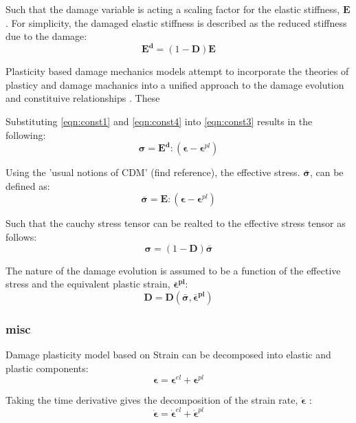 Such that the damage variable is acting a scaling factor for the elastic stiffness, $\mathbf{E}$. For simplicity, the damaged elastic stiffness is described as the
reduced stiffness due to the damage: 
\begin{equation}
\mathbf{E^{d}}=(1-\mathbf{D})\mathbf{E}\label{eqn:const4}
\end{equation}

Plasticity based damage mechanics models attempt to incorporate the
theories of plasticy and damage machanics into a unified approach
to the damage evolution and constituive relationships \cite{zhang_continuum_2010}. These 





Substituting \ref{eqn:const1} and \ref{eqn:const4} into \ref{eqn:const3}
results in the following: 
\begin{equation}
\boldsymbol{\sigma}=\mathbf{E^{d}}:(\boldsymbol{\epsilon}-\boldsymbol{\epsilon}^{pl})\label{eqn:const5}
\end{equation}


Using the 'usual notions of CDM' (find
reference), the effective stress. $\boldsymbol{\bar{\sigma}}$, can
be defined as: 
\begin{equation}
\boldsymbol{\bar{\sigma}}=\mathbf{E}:(\boldsymbol{\epsilon}-\boldsymbol{\epsilon}^{pl})\label{eqn:const6}
\end{equation}


Such that the cauchy stress tensor can be realted to the effective
stress tensor as follows: 
\begin{equation}
\boldsymbol{\sigma}=(1-\mathbf{D})\boldsymbol{\bar{\sigma}}\label{eqn:const7}
\end{equation}


The nature of the damage evolution is assumed to be a function of
the effective stress and the equivalent plastic strain, $\boldsymbol{\bar{\epsilon}^{pl}}$:
\begin{equation}
\mathbf{D}=\mathbf{D}(\boldsymbol{\bar{\sigma}},\boldsymbol{\bar{\epsilon}^{pl}})\label{eqn:const8}
\end{equation}

\subsubsection{misc}
Damage plasticity model based on Strain can be decomposed into elastic
and plastic components: 
\begin{equation}
\boldsymbol{\epsilon}=\boldsymbol{\epsilon}^{el}+\boldsymbol{\epsilon}^{pl}\label{eqn:const1}
\end{equation}


Taking the time derivative gives the decomposition of the strain rate,
$\boldsymbol{\dot{\epsilon}}$ : 
\begin{equation}
\boldsymbol{\dot{\epsilon}}=\boldsymbol{\dot{\epsilon}}^{el}+\boldsymbol{\dot{\epsilon}}^{pl}\label{eqn:const2}
\end{equation}
